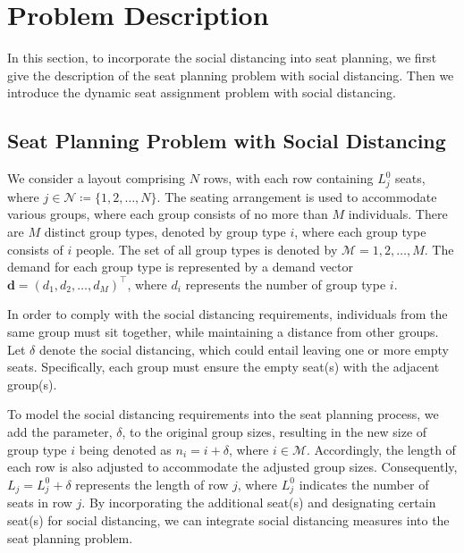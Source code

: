 \section{Problem Description}
In this section, to incorporate the social distancing into seat planning, we first give the description of the seat planning problem with social distancing. Then we introduce the dynamic seat assignment problem with social distancing.


\subsection{Seat Planning Problem with Social Distancing}\label{dynamic_demand}
We consider a layout comprising $N$ rows, with each row containing $L_j^0$ seats, where $j \in \mathcal{N} \coloneqq \{1,2, \ldots, N\}$. The seating arrangement is used to accommodate various groups, where each group consists of no more than $M$ individuals. There are $M$ distinct group types, denoted by group type $i$, where each group type consists of $i$ people. The set of all group types is denoted by $\mathcal{M} = {1, 2, \ldots, M}$. The demand for each group type is represented by a demand vector $\mathbf{d} = (d_1, d_2, \ldots, d_M)^{\intercal}$, where $d_i$ represents the number of group type $i$.

In order to comply with the social distancing requirements, individuals from the same group must sit together, while maintaining a distance from other groups. Let $\delta$ denote the social distancing, which could entail leaving one or more empty seats. Specifically, each group must ensure the empty seat(s) with the adjacent group(s).


To model the social distancing requirements into the seat planning process, we add the parameter, $\delta$, to the original group sizes, resulting in the new size of group type $i$ being denoted as $n_i = i + \delta$, where $i \in \mathcal{M}$. Accordingly, the length of each row is also adjusted to accommodate the adjusted group sizes. Consequently, $L_j = L_j^{0} + \delta$ represents the length of row $j$, where $L_j^{0}$ indicates the number of seats in row $j$. By incorporating the additional seat(s) and designating certain seat(s) for social distancing, we can integrate social distancing measures into the seat planning problem.

